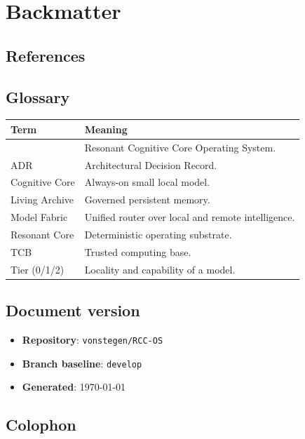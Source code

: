
\chapter{Backmatter}

\section{References}

\printbibliography[heading=none]

\section{Glossary}

\begin{longtable}{p{3.0cm}p{10.4cm}}
\toprule
\textbf{Term} & \textbf{Meaning} \\
\midrule
\RCCOS{} & Resonant Cognitive Core Operating System. \\
ADR & Architectural Decision Record. \\
Cognitive Core & Always-on small local model. \\
Living Archive & Governed persistent memory. \\
Model Fabric & Unified router over local and remote intelligence. \\
Resonant Core & Deterministic operating substrate. \\
TCB & Trusted computing base. \\
Tier (0/1/2) & Locality and capability of a model. \\
\bottomrule
\end{longtable}

\section{Document version}

\begin{itemize}
  \item \textbf{Repository}: \texttt{vonstegen/RCC-OS}
  \item \textbf{Branch baseline}: \texttt{develop}
  \item \textbf{Generated}: \today
\end{itemize}

\section{Colophon}

